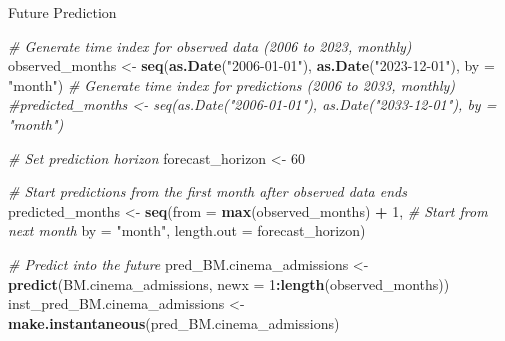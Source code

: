 \documentclass[
]{article}
\newenvironment{Shaded}{\begin{snugshade}}{\end{snugshade}}
\newcommand{\AttributeTok}[1]{\textcolor[rgb]{0.13,0.29,0.53}{#1}}
\newcommand{\CommentTok}[1]{\textcolor[rgb]{0.56,0.35,0.01}{\textit{#1}}}
\newcommand{\DecValTok}[1]{\textcolor[rgb]{0.00,0.00,0.81}{#1}}
\newcommand{\FunctionTok}[1]{\textcolor[rgb]{0.13,0.29,0.53}{\textbf{#1}}}
\newcommand{\NormalTok}[1]{#1}
\newcommand{\OtherTok}[1]{\textcolor[rgb]{0.56,0.35,0.01}{#1}}
\newcommand{\SpecialCharTok}[1]{\textcolor[rgb]{0.81,0.36,0.00}{\textbf{#1}}}
\newcommand{\StringTok}[1]{\textcolor[rgb]{0.31,0.60,0.02}{#1}}
\begin{document}
Future Prediction

\begin{Shaded}
\begin{Highlighting}[]
\CommentTok{\# Generate time index for observed data (2006 to 2023, monthly)}
\NormalTok{observed\_months }\OtherTok{\textless{}{-}} \FunctionTok{seq}\NormalTok{(}\FunctionTok{as.Date}\NormalTok{(}\StringTok{"2006{-}01{-}01"}\NormalTok{), }\FunctionTok{as.Date}\NormalTok{(}\StringTok{"2023{-}12{-}01"}\NormalTok{), }\AttributeTok{by =} \StringTok{"month"}\NormalTok{)}
\CommentTok{\# Generate time index for predictions (2006 to 2033, monthly)}
\CommentTok{\#predicted\_months \textless{}{-} seq(as.Date("2006{-}01{-}01"), as.Date("2033{-}12{-}01"), by = "month")}

\CommentTok{\# Set prediction horizon}
\NormalTok{forecast\_horizon }\OtherTok{\textless{}{-}} \DecValTok{60}  

\CommentTok{\# Start predictions from the first month after observed data ends}
\NormalTok{predicted\_months }\OtherTok{\textless{}{-}} \FunctionTok{seq}\NormalTok{(}\AttributeTok{from =} \FunctionTok{max}\NormalTok{(observed\_months) }\SpecialCharTok{+} \DecValTok{1}\NormalTok{,  }\CommentTok{\# Start from next month}
                         \AttributeTok{by =} \StringTok{"month"}\NormalTok{,                    }
                         \AttributeTok{length.out =}\NormalTok{ forecast\_horizon)   }
\end{Highlighting}
\end{Shaded}

\begin{Shaded}
\begin{Highlighting}[]
\CommentTok{\# Predict into the future}
\NormalTok{pred\_BM.cinema\_admissions }\OtherTok{\textless{}{-}} \FunctionTok{predict}\NormalTok{(BM.cinema\_admissions, }\AttributeTok{newx =} \DecValTok{1}\SpecialCharTok{:}\FunctionTok{length}\NormalTok{(observed\_months))}
\NormalTok{inst\_pred\_BM.cinema\_admissions }\OtherTok{\textless{}{-}} \FunctionTok{make.instantaneous}\NormalTok{(pred\_BM.cinema\_admissions)}
\end{Highlighting}
\end{Shaded}
\end{document}

